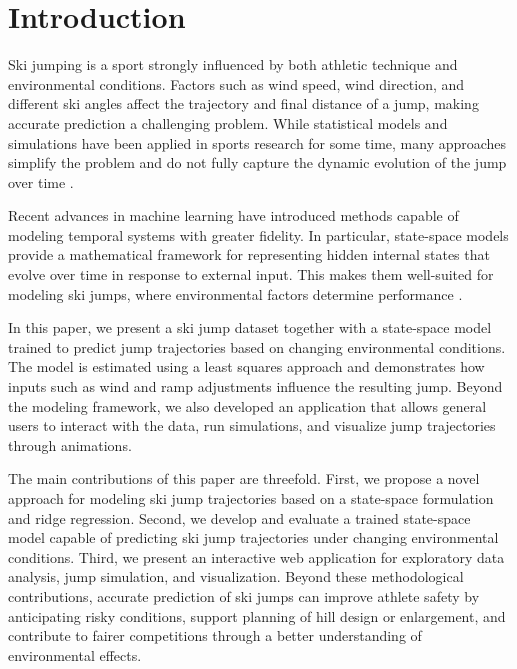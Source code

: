 \documentclass[sigconf,natbib=false, language=english]{acmart}
\begin{document}


\maketitle

\section{Introduction}


Ski jumping is a sport strongly influenced by both athletic technique and environmental conditions.
Factors such as wind speed, wind direction, and different ski angles affect the trajectory and final distance of a jump, making accurate prediction a challenging problem. 
While statistical models and simulations have been applied in sports research for some time, many approaches simplify the problem and do not fully capture the dynamic evolution of the jump over time \cite{SkiJumping_Book, fang2020trajectory, schwinn2022xlength, zecha2018convolutional}.

Recent advances in machine learning have introduced methods capable of modeling temporal systems with greater fidelity. In particular, state-space models provide a mathematical framework for representing hidden internal states that evolve over time in response to external input. This makes them well-suited for modeling ski jumps, where environmental factors determine performance \cite{SSM_YouTube}.

In this paper, we present a ski jump dataset together with a 
state-space model trained to predict jump trajectories based on 
changing environmental conditions. 
The model is estimated using a least squares approach and demonstrates 
how inputs such as wind and ramp adjustments influence the resulting 
jump. Beyond the modeling framework, we also developed an application 
that allows general users to interact with the data, run simulations, 
and visualize jump trajectories through animations. 

The main contributions of this paper are threefold. 
First, we propose a novel approach for modeling ski jump trajectories 
based on a state-space formulation and ridge regression. 
Second, we develop and evaluate a trained state-space model capable 
of predicting ski jump trajectories under changing environmental 
conditions. Third, we present an interactive web application for 
exploratory data analysis, jump simulation, and visualization. 
Beyond these methodological contributions, accurate prediction of ski 
jumps can improve athlete safety by anticipating risky conditions, 
support planning of hill design or enlargement, and contribute to 
fairer competitions through a better understanding of environmental 
effects.
\end{document}

